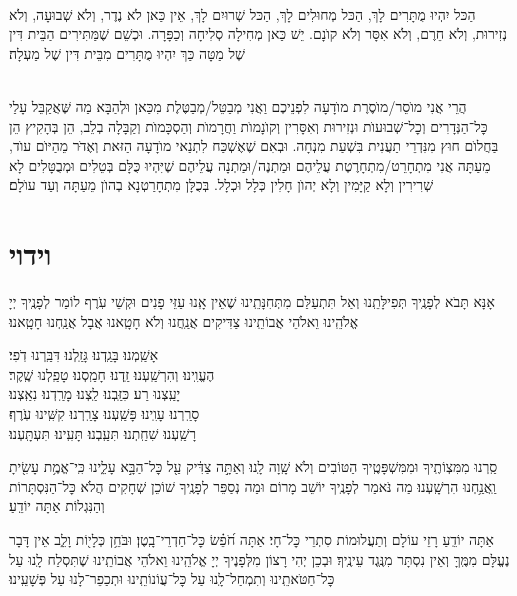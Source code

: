 \documentclass[twoside, openany, parskip=half, 11pt]{book}
\begin{document}
\\
הַכּל יִהְיוּ מֻתָּרִים לָךְ, הַכּל מְחוּלִים לָךְ, הַכּל שְׁרוּיִם לָךְ, אֵין כַּאן לֺא נֶדֶר, וְלֺא שְׁבוּעָה, וְלֺא נְזִירוּת, וְלֺא חֵרֶם, וְלֺא אִסָּר וְלֺא קוׂנָם. יֵשׁ כַּאן מְחִילָה סְלִיחָה וְכַפָּרָה. וּכְשֵׁם שֶׁמַּתִּירִים הַבֵּית דִּין שֶׁל מַטָּה כַּךְ יִהְיוּ מֻתָּרִים מִבֵּית דִּין שֶׁל מַעְלָה׃

\\
הֲרֵי אֲנִי מוֺסֵר/מוֺסֶרֶת מוׂדָעָה לִפְנֵיכֶם וַאֲנִי מְבַטֵּל/מְבַטֶּלֶת מִכַּאן וּלְהַבָּא מַה שֶּׁאֲקַבֵּל עָלַי כׇּל־הַנְּדָרִים וְכׇל־שְׁבוּעוׂת וּנְזִירוּת וְאִסָּרִין וְקוׂנָמוׂת וַחֲרָמוׂת וְהַסְכָּמוׂת וְקַבָּלָה בְלֵב, הֵן בְּהָקִיץ הֵן בַּחֲלוׂם חוּץ מִנִּדְרֵי תַעֲנִית בִּשְׁעַת מִנְחָה. וּבְאִם שֶׁאֶשְׁכַּח לִתְנַאי מוׂדָעָה הַזּאת וְאֶדּׂר מֵהַיּוׂם עוׂד, מֵעַתָּה אֲנִי מִתְחָרֵט/מִתְחָרֶטֶת עֲלֵיהֶם וּמַתְנֶה/וּמַתְנָה עֲלֵיהֶם שֶׁיִּהְיוּ כֻּלָּם בְּטֵלִים וּמְבֻטָּלִים לָא שְׁרִירִין וְלָא קַיָּמִין וְלָא יְהוׂן חָלִין כְּלָל וּכְלָל. בְּכֻלָּן מִתְחָרַטְנָא בְהוׂן מֵעַתָּה וְעַד עוׂלָם׃

\vfill
\sepline




\chapter[וידוי]{ וידוי }

אָנָּא תָּבֹא לְפָנֶֽיךָ תְּפִילָּתֵֽנוּ וְאַל תִּתְעַלַּם מִתְּחִנָּתֵֽינוּ שֶׁאֵין אָֽנוּ עַזֵּי פָנִים וּקְשֵׁי עֹֽרֶף לוֹמַר לְפָנֶֽיךָ יְיָ אֱלֹהֵֽינוּ וֵאלֹהֵי אֲבוֹתֵֽינוּ צַדִּיקִים אֲנַֽחֲנוּ וְלֹא חָטָֽאנוּ אֲבָל אֲנַֽחְנוּ חָטָֽאנוּ׃

אָשַֽׁמְנוּ׃ בָּגַֽדְנוּ׃ גָּזַֽלְנוּ׃ דִּבַּֽרְנוּ דֹֽפִי׃ \\
הֶעֱוִֽינוּ׃ וְהִרְשַֽׁעְנוּ׃ זַֽדְנוּ׃ חָמַֽסְנוּ׃ טָפַֽלְנוּ שֶֽׁקֶר׃\\
יָעַֽצְנוּ רַע׃ כִּזַּֽבְנוּ׃ לַֽצְנוּ׃ מָרַֽדְנוּ׃ נִאַֽצְנוּ׃ \\
סָרַֽרְנוּ׃ עָוִֽינוּ׃ פָּשַֽׁעְנוּ׃ צָרַֽרְנוּ׃ קִשִּֽׁינוּ עֹֽרֶף׃\\
רָשַֽׁעְנוּ׃ שִׁחַֽתְנוּ׃ תִּעַֽבְנוּ׃ תָּעִֽינוּ׃ תִּעְתָּֽעְנוּ׃

סַֽרְנוּ מִמִּצְוֹתֶֽיךָ וּמִמִּשְׁפָּטֶֽיךָ הַטּוֹבִים וְלֹא שָֽׁוָה לָֽנוּ׃ וְאַתָּ֣ה צַדִּ֔יק עַ֖ל כׇּל־הַבָּ֣א עָלֵ֑ינוּ כִּֽי־אֱמֶ֥ת עָשִׂ֖יתָ וַֽאֲנַ֥חְנוּ הִרְשָֽׁעְנוּ׃ מַה נֹּאמַר לְפָנֶֽיךָ יוֹשֵׁב מָרוֹם וּמַה נְסַפֵּר לְפָנֶֽיךָ שׁוֹכֵן שְׁחָקִים הֲלֹא כׇּל־הַנִּסְתָּרוֹת וְהַנִּגְלוֹת אַתָּה יוֹדֵֽעַ׃

אַתָּה יוֹדֵֽעַ רָזֵי עוֹלָם וְתַעֲלוּמוֹת סִתְרֵי כׇּל־חָי׃ אַתָּה חֹ֝פֵ֗שׂ כׇּל־חַדְרֵי־בָֽטֶן׃ וּבֹּחֵ֥ן כְּלָי֖וֹת וָלֵ֑ב אֵין דָּבָר נֶעֱלָּם מִמֶּֽךָּ וְאֵין נִסְתָּר מִנֶּֽגֶד עֵינֶֽיךָ׃ וּבְכֵן יְהִי רָצוֹן מִלְּפָנֶיךָ יְיָ אֱלֹהֵֽינוּ וֵאלֹהֵי אֲבוֹתֵֽינוּ שֶׁתִּסְלַח לָֽנוּ עַל כׇּל־חַטֹּאתֵֽינוּ וְתִמְחַל־לָֽנוּ עַל כׇּל־עֲוֹנוֹתֵֽינוּ וּתְכַפֵר־לָנוּ עַל פְּשָׁעֵֽינוּ׃
\end{document}
